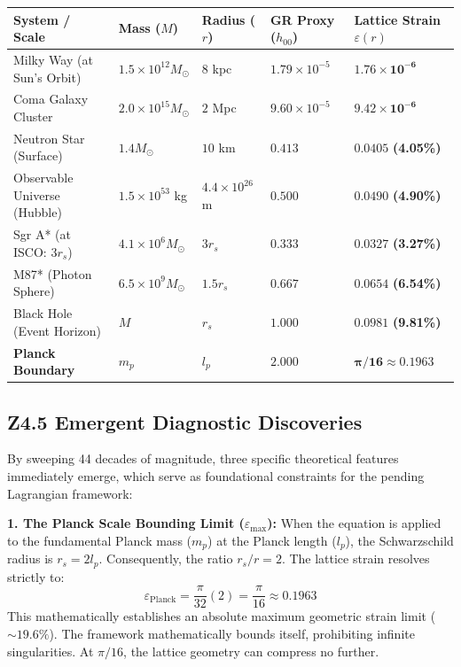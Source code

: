 \documentclass[11pt, letterpaper, openany]{book}
\begin{document}
\begin{center}
\renewcommand{\arraystretch}{1.2}
\small
\begin{tabular}{|p{3.5cm}|p{2cm}|p{2.5cm}|p{2.2cm}|p{2.5cm}|}
\hline
\rowcolor{kishblue!12}
\textbf{System / Scale} & \textbf{Mass ($M$)} & \textbf{Radius ($r$)} & \textbf{GR Proxy ($h_{00}$)} & \textbf{Lattice Strain $\varepsilon(r)$} \\
\hline
Milky Way (at Sun's Orbit) & $1.5 \times 10^{12} M_\odot$ & $8$ kpc & $1.79 \times 10^{-5}$ & $\mathbf{1.76 \times 10^{-6}}$ \\
\hline
Coma Galaxy Cluster & $2.0 \times 10^{15} M_\odot$ & $2$ Mpc & $9.60 \times 10^{-5}$ & $\mathbf{9.42 \times 10^{-6}}$ \\
\hline
Neutron Star (Surface) & $1.4 M_\odot$ & $10$ km & $0.413$ & $\mathbf{0.0405}$ \textbf{(4.05\%)} \\
\hline
Observable Universe (Hubble) & $1.5 \times 10^{53}$ kg & $4.4 \times 10^{26}$ m & $0.500$ & $\mathbf{0.0490}$ \textbf{(4.90\%)} \\
\hline
Sgr A* (at ISCO: $3 r_s$) & $4.1 \times 10^6 M_\odot$ & $3 r_s$ & $0.333$ & $\mathbf{0.0327}$ \textbf{(3.27\%)} \\
\hline
M87* (Photon Sphere) & $6.5 \times 10^9 M_\odot$ & $1.5 r_s$ & $0.667$ & $\mathbf{0.0654}$ \textbf{(6.54\%)} \\
\hline
Black Hole (Event Horizon) & $M$ & $r_s$ & $1.000$ & $\mathbf{0.0981}$ \textbf{(9.81\%)} \\
\hline
\rowcolor{goldseal!20}
\textbf{Planck Boundary} & $m_p$ & $l_p$ & $2.000$ & $\mathbf{\pi/16 \approx 0.1963}$ \\
\hline
\end{tabular}
\end{center}

\subsection*{Z4.5 Emergent Diagnostic Discoveries}

By sweeping 44 decades of magnitude, three specific theoretical features immediately emerge, which serve as foundational constraints for the pending Lagrangian framework:

\textbf{1. The Planck Scale Bounding Limit ($\varepsilon_{\text{max}}$):}
When the equation is applied to the fundamental Planck mass ($m_p$) at the Planck length ($l_p$), the Schwarzschild radius is $r_s = 2 l_p$. Consequently, the ratio $r_s/r = 2$. 
The lattice strain resolves strictly to:
\[
\varepsilon_{\text{Planck}} = \frac{\pi}{32} (2) = \frac{\pi}{16} \approx 0.1963
\]
This mathematically establishes an absolute maximum geometric strain limit ($\sim 19.6\%$). The framework mathematically bounds itself, prohibiting infinite singularities. At $\pi/16$, the lattice geometry can compress no further.
\end{document}
